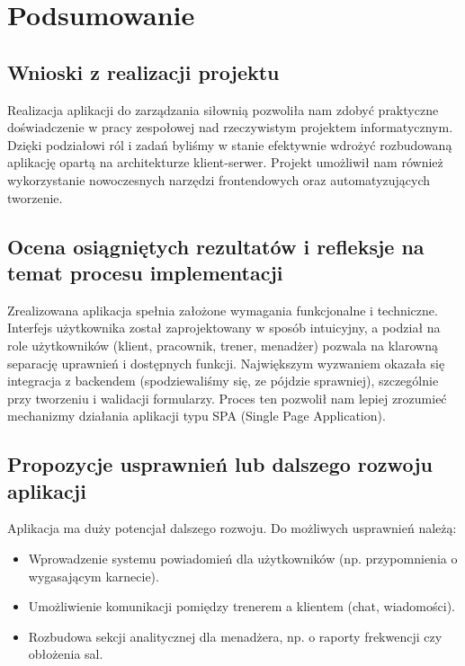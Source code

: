 \documentclass[../../spr.tex]{subfiles}
\begin{document}
\section{Podsumowanie}

\subsection{Wnioski z realizacji projektu}

Realizacja aplikacji do zarządzania siłownią pozwoliła nam zdobyć praktyczne doświadczenie
w pracy zespołowej nad rzeczywistym projektem informatycznym.
Dzięki podziałowi ról i zadań byliśmy w stanie efektywnie wdrożyć rozbudowaną
aplikację opartą na architekturze klient-serwer.
Projekt umożliwił nam również wykorzystanie nowoczesnych narzędzi
frontendowych oraz automatyzujących tworzenie.

\subsection{Ocena osiągniętych rezultatów i refleksje na temat procesu implementacji}

Zrealizowana aplikacja spełnia założone wymagania funkcjonalne i techniczne.
Interfejs użytkownika został zaprojektowany w sposób intuicyjny,
a podział na role użytkowników (klient, pracownik, trener, menadżer)
pozwala na klarowną separację uprawnień i dostępnych funkcji.
Największym wyzwaniem okazała się integracja z backendem (spodziewaliśmy się, ze pójdzie sprawniej),
szczególnie przy tworzeniu i walidacji formularzy.
Proces ten pozwolił nam lepiej zrozumieć mechanizmy działania
aplikacji typu SPA (Single Page Application).

\subsection{Propozycje usprawnień lub dalszego rozwoju aplikacji}

Aplikacja ma duży potencjał dalszego rozwoju. Do możliwych usprawnień należą:

\begin{itemize}
  \item Wprowadzenie systemu powiadomień dla użytkowników (np. przypomnienia o wygasającym karnecie).
  \item Umożliwienie komunikacji pomiędzy trenerem a klientem (chat, wiadomości).
  \item Rozbudowa sekcji analitycznej dla menadżera, np. o raporty frekwencji czy obłożenia sal.
\end{itemize}
\end{document}
